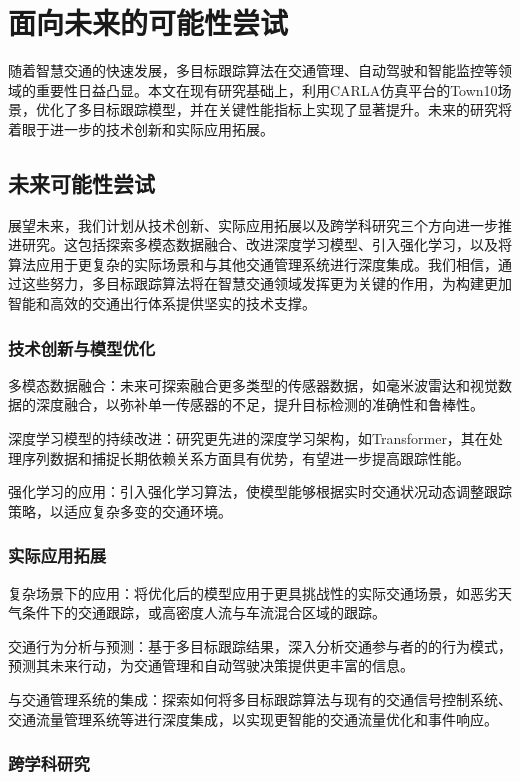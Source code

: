 \chapter{面向未来的可能性尝试}
随着智慧交通的快速发展，多目标跟踪算法在交通管理、自动驾驶和智能监控等领域的重要性日益凸显。本文在现有研究基础上，利用CARLA仿真平台的Town10场景，优化了多目标跟踪模型，并在关键性能指标上实现了显著提升。未来的研究将着眼于进一步的技术创新和实际应用拓展。


\section{未来可能性尝试}
展望未来，我们计划从技术创新、实际应用拓展以及跨学科研究三个方向进一步推进研究\cite{voigtlaender2019mots}。这包括探索多模态数据融合、改进深度学习模型、引入强化学习，以及将算法应用于更复杂的实际场景和与其他交通管理系统进行深度集成。我们相信，通过这些努力，多目标跟踪算法将在智慧交通领域发挥更为关键的作用，为构建更加智能和高效的交通出行体系提供坚实的技术支撑。


\subsection{技术创新与模型优化}
多模态数据融合：未来可探索融合更多类型的传感器数据，如毫米波雷达和视觉数据的深度融合，以弥补单一传感器的不足，提升目标检测的准确性和鲁棒性。

深度学习模型的持续改进：研究更先进的深度学习架构，如Transformer，其在处理序列数据和捕捉长期依赖关系方面具有优势，有望进一步提高跟踪性能。

强化学习的应用：引入强化学习算法，使模型能够根据实时交通状况动态调整跟踪策略，以适应复杂多变的交通环境。

\subsection{实际应用拓展}

复杂场景下的应用：将优化后的模型应用于更具挑战性的实际交通场景，如恶劣天气条件下的交通跟踪，或高密度人流与车流混合区域的跟踪\cite{wang2021multiple}。

交通行为分析与预测：基于多目标跟踪结果，深入分析交通参与者的的行为模式，预测其未来行动，为交通管理和自动驾驶决策提供更丰富的信息。

与交通管理系统的集成：探索如何将多目标跟踪算法与现有的交通信号控制系统、交通流量管理系统等进行深度集成，以实现更智能的交通流量优化和事件响应。

\subsection{跨学科研究}

